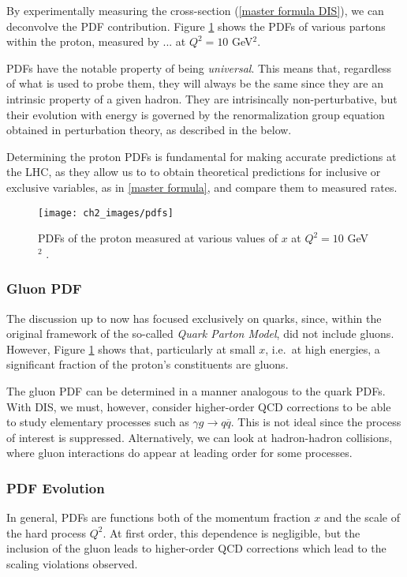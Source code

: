 \documentclass[10pt,a4paper]{book}
\begin{document}
By experimentally measuring the cross-section (\ref{master formula DIS}), we can deconvolve the PDF contribution. Figure \ref{PDF plot} shows the PDFs of various partons within the proton, measured by ... at $Q^2 = 10$ GeV$^2$. 

PDFs have the notable property of being \emph{universal}. This means that, regardless of what is used to probe them, they will always be the same since they are an intrinsic property of a given hadron. They are intrisincally non-perturbative, but their evolution with energy is governed by the renormalization group equation obtained in perturbation theory, as described in the below. 

Determining the proton PDFs is fundamental for making accurate predictions at the LHC, as they allow us to to obtain theoretical predictions for inclusive or exclusive variables, as in \ref{master formula}, and compare them to measured rates. 
\begin{figure}
\centering
\texttt{[image: ch2\_images/pdfs]}
\caption{PDFs of the proton measured at various values of $x$ at $Q^2 = 10$ GeV$^2$ \cite{Metcalfe}.}
\label{PDF plot}
\end{figure}

\subsubsection{Gluon PDF}

The discussion up to now has focused exclusively on quarks, since, within the original framework of the so-called \emph{Quark Parton Model}, did not include gluons. However, Figure \ref{PDF plot} shows that, particularly at small $x$, i.e.\ at high energies, a significant fraction of the proton's constituents are gluons.

The gluon PDF can be determined in a manner analogous to the quark PDFs. With DIS, we must, however, consider higher-order QCD corrections to be able to study elementary processes such as $\gamma g \rightarrow q \overline{q}$. This is not ideal since the process of interest is suppressed. Alternatively, we can look at hadron-hadron collisions, where gluon interactions do appear at leading order for some processes.

\subsubsection{PDF Evolution}

In general, PDFs are functions both of the momentum fraction $x$ and the scale of the hard process $Q^2$. At first order, this dependence is negligible, but the inclusion of the gluon leads to higher-order QCD corrections which lead to the scaling violations observed. 
\end{document}
